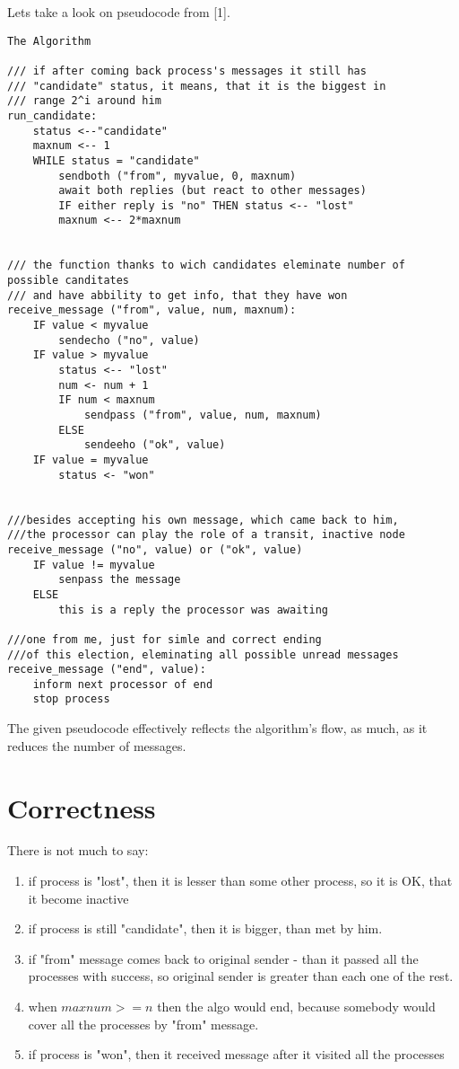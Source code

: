 \documentclass{article}
\begin{document}
Lets take a look on pseudocode from [1].
\begin{lstlisting}
The Algorithm

/// if after coming back process's messages it still has
/// "candidate" status, it means, that it is the biggest in
/// range 2^i around him
run_candidate:
    status <--"candidate"
    maxnum <-- 1
    WHILE status = "candidate"
        sendboth ("from", myvalue, 0, maxnum)
        await both replies (but react to other messages)
        IF either reply is "no" THEN status <-- "lost"
        maxnum <-- 2*maxnum


/// the function thanks to wich candidates eleminate number of possible canditates
/// and have abbility to get info, that they have won
receive_message ("from", value, num, maxnum):
    IF value < myvalue
        sendecho ("no", value)
    IF value > myvalue
        status <-- "lost"
        num <- num + 1
        IF num < maxnum
            sendpass ("from", value, num, maxnum)
        ELSE
            sendeeho ("ok", value)
    IF value = myvalue
        status <- "won"


///besides accepting his own message, which came back to him,
///the processor can play the role of a transit, inactive node
receive_message ("no", value) or ("ok", value)
    IF value != myvalue
        senpass the message
    ELSE
        this is a reply the processor was awaiting

///one from me, just for simle and correct ending
///of this election, eleminating all possible unread messages
receive_message ("end", value):
    inform next processor of end
    stop process
\end{lstlisting}
The given pseudocode effectively reflects the algorithm's flow, as much, as it reduces the number of messages.


\section*{Correctness}
There is not much to say:
\begin{enumerate}
    \item if process is "lost", then it is lesser than some other process, so it is OK, that it become inactive
    \item if process is still "candidate", then it is bigger, than met by him.
    \item if "from" message comes back to original sender - than it passed all the processes with success, so original sender is greater than each one of the rest.
    \item when \(maxnum >= n\) then the algo would end, because somebody would cover all the processes by "from" message.
    \item if process is "won", then it received message after it visited all the processes
\end{enumerate}
\end{document}
